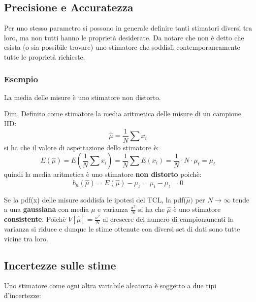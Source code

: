 \subsection{Precisione e Accuratezza}

 Per uno stesso parametro si possono in generale definire tanti stimatori diversi tra loro, ma non tutti hanno le propriet\`{a} desiderate. Da notare che non \`{e} detto che esista (o sia possibile trovare) uno stimatore che soddisfi contemporaneamente tutte le propriet\`{a} richieste.
\subsubsection{Esempio} 

La media delle misure \`{e} uno stimatore non distorto. \newline

Dim.
\newline
Definito come stimatore la media aritmetica delle misure di un campione IID:
\begin{equation*}
		 \hat{\mu} = \frac{1}{N}\sum{x_{i}} 
\end{equation*}
si ha che il valore di aspettazione dello stimatore \`{e}:
\begin{equation*}
	  E(\hat{\mu})= E(\frac{1}{N}\sum x_{i})= \frac{1}{N}\sum E(x_{i})= \frac{1}{N} \cdot N \cdot \mu_{t} = \mu_{t} 
\end{equation*}
quindi la media aritmetica \`{e} uno stimatore \textbf{non distorto} poich\`{e}:
\begin{equation*}
	 b_n(\hat{\mu}) = E(\hat{\mu}) - \mu_{t} = \mu_{t} - \mu_{t} = 0  
\end{equation*}

\noindent Se la pdf(x) delle misure soddisfa le ipotesi del TCL, la pdf($\hat{\mu})$ per $N \rightarrow \infty$ tende a una \textbf{gaussiana} con media $\mu$ e varianza $\frac{\sigma^2}{N}$ si ha che $\hat{\mu}$ \`{e} uno stimatore \textbf{consistente}. Poich\`{e} $V[\hat{\mu}] = \frac{\sigma^2}{N}$ al crescere del numero di campionamenti la varianza si riduce e dunque le stime ottenute con diversi set di dati sono tutte vicine tra loro.


\subsection{Incertezze sulle stime}

\noindent Uno stimatore come ogni altra variabile aleatoria \`{e} soggetto a due tipi d'incertezze:

